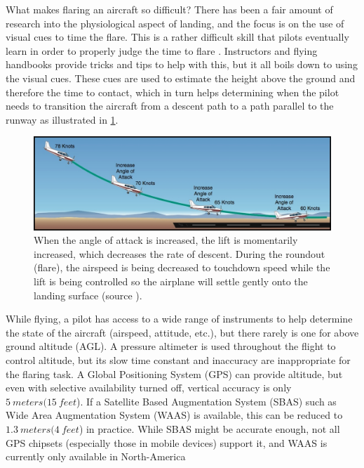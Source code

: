 \documentclass[letterpaper, conference]{IEEEtran}  %
\begin{document}
What makes flaring an aircraft so difficult? There has been a fair amount of research into the physiological aspect of landing, and the focus is on the use of visual cues to time the flare. This is a rather difficult skill that pilots eventually learn in order to properly judge the time to flare \cite{Palmisano2005}. Instructors and flying handbooks provide tricks and tips to help with this, but it all boils down to using the visual cues. These cues are used to estimate the height above the ground and therefore the time to contact, which in turn helps determining when the pilot needs to transition the aircraft from a descent path to a path parallel to the runway as illustrated in \cref{fig:flare}.


\begin{figure}[ht]
\centering
\includegraphics[width=\columnwidth]{flare.jpg} 
\caption{When the angle of attack is increased, the lift is momentarily increased, which decreases the rate of descent.  During the roundout (flare), the airspeed is being decreased to touchdown speed while the lift is being controlled so the airplane will settle gently onto the landing surface (source \cite{FAASafety}).}
\label{fig:flare}
\end{figure}

While flying, a pilot has access to a wide range of instruments to help determine the state of the aircraft (airspeed, attitude, etc.), but there rarely is one for above ground altitude (AGL). A pressure altimeter is used throughout the flight to control altitude, but its slow time constant and inaccuracy are inappropriate for the flaring task. A Global Positioning System (GPS) can provide altitude, but even with selective availability turned off, vertical accuracy is only $\SI{5}{meters} (\SI{15}{feet}$). If a Satellite Based Augmentation System (SBAS) such as Wide Area Augmentation System (WAAS) is available, this can be reduced to $\SI{1.3}{meters} (\SI{4}{feet}$) in practice. While SBAS might be accurate enough, not all GPS chipsets (especially those in mobile devices) support it, and WAAS is currently only available in North-America \cite{WAASwiki}
\end{document}

